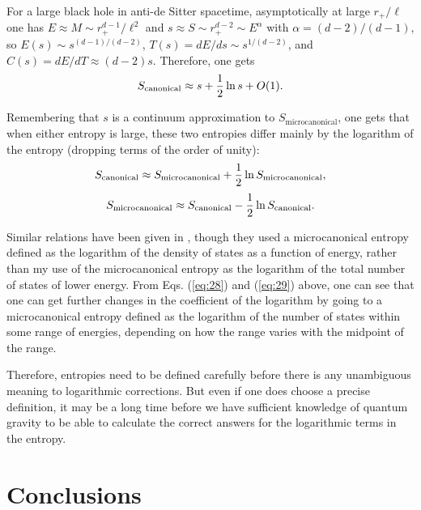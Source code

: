 \documentclass[12pt]{article} \usepackage{latexsym}
\begin{document}
For a large black hole in anti-de Sitter spacetime, asymptotically at
large $r_+/\ell$ one has $E \approx M \sim r_+^{d-1}/\ell^2$ and $s
\approx S \sim r_+^{d-2} \sim E^\alpha$ with $\alpha = (d-2)/(d-1)$, so
$E(s) \sim s^{(d-1)/(d-2)}$, $T(s) = dE/ds \sim s^{1/(d-2)}$, and $C(s)
= dE/dT \approx (d-2)s$.  Therefore, one gets
 \begin{equation}
 S_{\mathrm{canonical}} \approx s + {1\over 2}\ln{s} + O(1).
 \label{eq:38}
 \end{equation}

Remembering that $s$ is a continuum approximation to
$S_{\mathrm{microcanonical}}$, one gets that when either entropy is
large, these two entropies differ mainly by the logarithm of the
entropy (dropping terms of the order of unity):
 \begin{equation}
  S_{\mathrm{canonical}} \approx S_{\mathrm{microcanonical}}
   + {1\over 2}\ln{S_{\mathrm{microcanonical}}},
 \label{eq:39} \end{equation}
 \begin{equation}
  S_{\mathrm{microcanonical}} \approx S_{\mathrm{canonical}}
   - {1\over 2}\ln{S_{\mathrm{canonical}}}.
 \label{eq:40}
  \end{equation}

Similar relations have been given in \cite{DMB,CM2}, though they used a
microcanonical entropy defined as the logarithm of the density of
states as a function of energy, rather than my use of the
microcanonical entropy as the logarithm of the total number of states
of lower energy.  From Eqs. (\ref{eq:28}) and (\ref{eq:29}) above, one
can see that one can get further changes in the coefficient of the
logarithm by going to a microcanonical entropy defined as the logarithm
of the number of states within some range of energies, depending on how
the range varies with the midpoint of the range.

Therefore, entropies need to be defined carefully before there is any
unambiguous meaning to logarithmic corrections.  But even if one does
choose a precise definition, it may be a long time before we have
sufficient knowledge of quantum gravity to be able to calculate the
correct answers for the logarithmic terms in the entropy.

\section{Conclusions}
\end{document}
